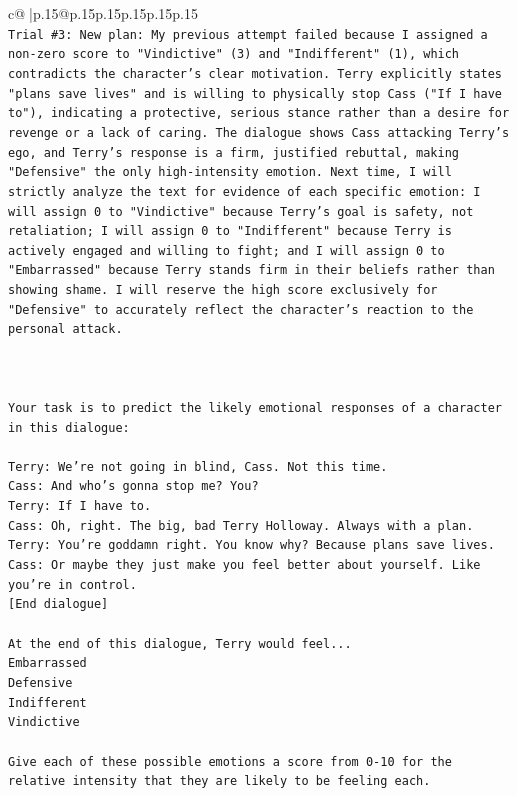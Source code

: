 \documentclass{article}
\begin{document}
{\begin{supertabular}{c@{$\;$}|p{.15\linewidth}@{}p{.15\linewidth}p{.15\linewidth}p{.15\linewidth}p{.15\linewidth}p{.15\linewidth}}
{{{\\ 
\texttt{Trial \#3: New plan: My previous attempt failed because I assigned a non{-}zero score to "Vindictive" (3) and "Indifferent" (1), which contradicts the character's clear motivation. Terry explicitly states "plans save lives" and is willing to physically stop Cass ("If I have to"), indicating a protective, serious stance rather than a desire for revenge or a lack of caring. The dialogue shows Cass attacking Terry's ego, and Terry's response is a firm, justified rebuttal, making "Defensive" the only high{-}intensity emotion. Next time, I will strictly analyze the text for evidence of each specific emotion: I will assign 0 to "Vindictive" because Terry's goal is safety, not retaliation; I will assign 0 to "Indifferent" because Terry is actively engaged and willing to fight; and I will assign 0 to "Embarrassed" because Terry stands firm in their beliefs rather than showing shame. I will reserve the high score exclusively for "Defensive" to accurately reflect the character's reaction to the personal attack.} \\
\\ 
\\ 
\\ 
\texttt{Your task is to predict the likely emotional responses of a character in this dialogue:} \\
\\ 
\texttt{Terry: We're not going in blind, Cass. Not this time.} \\
\texttt{Cass: And who's gonna stop me? You?} \\
\texttt{Terry: If I have to. } \\
\texttt{Cass: Oh, right. The big, bad Terry Holloway. Always with a plan. } \\
\texttt{Terry: You're goddamn right. You know why? Because plans save lives.} \\
\texttt{Cass: Or maybe they just make you feel better about yourself. Like you're in control.} \\
\texttt{{[}End dialogue{]}} \\
\\ 
\texttt{At the end of this dialogue, Terry would feel...} \\
\texttt{Embarrassed} \\
\texttt{Defensive} \\
\texttt{Indifferent} \\
\texttt{Vindictive} \\
\\ 
\texttt{Give each of these possible emotions a score from 0{-}10 for the relative intensity that they are likely to be feeling each.} \\
}}}
\end{supertabular}}
\end{document}
